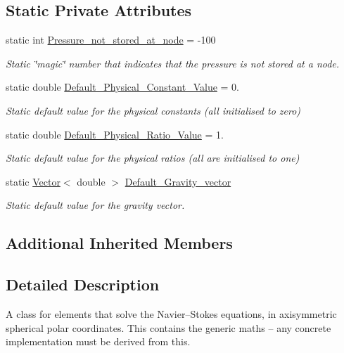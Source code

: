 \subsection*{Static Private Attributes}
\begin{DoxyCompactItemize}
\item 
static int \hyperlink{classoomph_1_1SphericalNavierStokesEquations_a6e9d12a0f822100dea121402eabcab1d}{Pressure\+\_\+not\+\_\+stored\+\_\+at\+\_\+node} = -\/100
\begin{DoxyCompactList}\small\item\em Static \char`\"{}magic\char`\"{} number that indicates that the pressure is not stored at a node. \end{DoxyCompactList}\item 
static double \hyperlink{classoomph_1_1SphericalNavierStokesEquations_aabcb425c7d08743c687838dc0c87a689}{Default\+\_\+\+Physical\+\_\+\+Constant\+\_\+\+Value} = 0.
\begin{DoxyCompactList}\small\item\em Static default value for the physical constants (all initialised to zero) \end{DoxyCompactList}\item 
static double \hyperlink{classoomph_1_1SphericalNavierStokesEquations_a3c7f1bfc912796a13db1fe49536ef369}{Default\+\_\+\+Physical\+\_\+\+Ratio\+\_\+\+Value} = 1.
\begin{DoxyCompactList}\small\item\em Static default value for the physical ratios (all are initialised to one) \end{DoxyCompactList}\item 
static \hyperlink{classoomph_1_1Vector}{Vector}$<$ double $>$ \hyperlink{classoomph_1_1SphericalNavierStokesEquations_aceb58ae2aadd0d0f301f5728e767d0b9}{Default\+\_\+\+Gravity\+\_\+vector}
\begin{DoxyCompactList}\small\item\em Static default value for the gravity vector. \end{DoxyCompactList}\end{DoxyCompactItemize}
\subsection*{Additional Inherited Members}


\subsection{Detailed Description}
A class for elements that solve the Navier--Stokes equations, in axisymmetric spherical polar coordinates. This contains the generic maths -- any concrete implementation must be derived from this.

